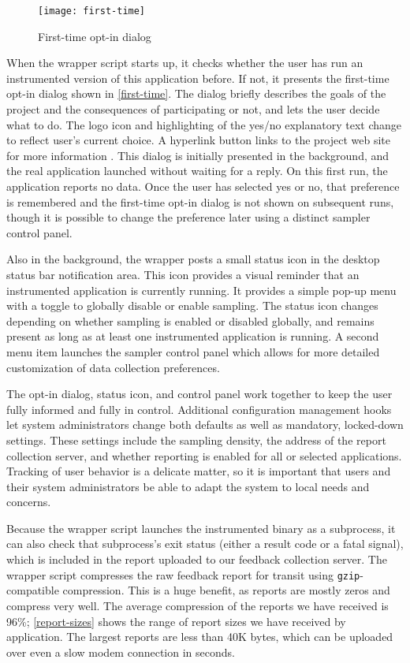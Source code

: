 \documentclass[10pt,twocolumn]{article}
\begin{document}
\begin{figure}
  \centering
  \texttt{[image: first-time]}
  \caption{First-time opt-in dialog}
  \label{first-time}
\end{figure}

When the wrapper script starts up, it checks whether the user has run
an instrumented version of this application before.  If not, it
presents the first-time opt-in dialog shown in
\autoref{first-time}. The dialog briefly describes the goals of the
project and the consequences of participating or not, and lets the
user decide what to do.  The logo icon and highlighting of the yes/no
explanatory text change to reflect user's current choice.  A hyperlink
button links to the project web site for more information
\cite{Liblit:CBIP}.  This
dialog is initially presented in the background, and the real
application launched without waiting for a reply.  On this first run,
the application reports no data. Once the user has selected yes or no,
that preference is remembered and the first-time opt-in dialog is not
shown on subsequent runs, though it is possible to change the
preference later using a distinct sampler control panel.

Also in the background, the wrapper posts a small status icon in
the desktop status bar notification area.  This icon provides a
visual reminder that an instrumented application is currently
running. It provides a simple pop-up menu with a toggle to globally
disable or enable sampling.  The status icon changes depending on
whether sampling is enabled or disabled globally, and remains present
as long as at least one instrumented application is running.  A second
menu item launches the sampler control panel which allows for
more detailed customization of data collection preferences.

The opt-in dialog, status icon, and control panel work together to
keep the user fully informed and fully in control.  Additional
configuration management hooks let system administrators change both
defaults as well as mandatory, locked-down settings.  These settings
include the sampling density, the address of the report collection
server, and whether reporting is enabled for all or selected
applications.  Tracking of user behavior is a delicate matter, so it
is important that users and their system administrators be able to
adapt the system to local needs and concerns.

Because the wrapper script launches the instrumented binary as a
subprocess, it can also check that subprocess's exit status (either a
result code or a fatal signal), which is included in the report
uploaded to our feedback collection server.
The wrapper script compresses the raw feedback report for transit
using \texttt{gzip}-compatible compression.  This is a huge benefit, as reports
are mostly zeros and compress very well.  The average compression
of the reports we have received is 96\%; \autoref{report-sizes} shows
the range of report sizes we have received by application.  
The largest reports are less than 40K bytes, which can be uploaded
over even a slow modem connection in seconds.
\end{document}

